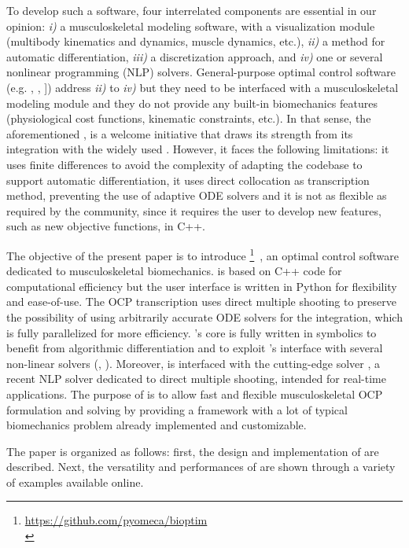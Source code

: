 To develop such a software, four interrelated components are essential in our opinion: \textit{i)} a musculoskeletal modeling software, with a visualization module (multibody kinematics and dynamics, muscle dynamics, etc.), \textit{ii)} a method for automatic differentiation, \textit{iii)} a discretization approach, and \textit{iv)} one or several nonlinear programming (NLP) solvers. 
General-purpose optimal control software (e.g. \gpopsii \cite{patterson2014gpops}, \muscodii \cite{leineweber2003efficient1,leineweber2003efficient2}, \acado \cite{houska2011acado}]) address \textit{ii)} to \textit{iv)} but they need to be interfaced with a musculoskeletal modeling module and they do not provide any built-in biomechanics features (physiological cost functions, kinematic constraints, etc.). 
In that sense, the aforementioned \moco, is a welcome initiative that draws its strength from its integration with the widely used \opensim.
However, it faces the following limitations: it uses finite differences to avoid the complexity of adapting the \opensim codebase to support automatic differentiation, it uses direct collocation as transcription method, preventing the use of adaptive ODE solvers and it is not as flexible as required by the community, since it requires the user to develop new features, such as new objective functions, in C++. 

The objective of the present paper is to introduce \bioptim\footnote{\url{https://github.com/pyomeca/bioptim}\\}~\cite{bioptim2021michaud}, an  optimal control software dedicated to musculoskeletal biomechanics.
\bioptim is based on C++ code for computational efficiency but the user interface is written in Python for flexibility and ease-of-use. 
The OCP transcription uses direct multiple shooting to preserve the possibility of using arbitrarily accurate ODE solvers for the integration, which is fully parallelized for more efficiency.
\bioptim's core is fully written in \casadi symbolics to benefit from algorithmic differentiation and to exploit \casadi 's interface with several non-linear solvers (\ipopt, \snopt).
Moreover, \bioptim is interfaced with the cutting-edge solver \acados, a recent NLP solver dedicated to direct multiple shooting, intended for real-time applications.
The purpose of \bioptim is to allow fast and flexible musculoskeletal OCP formulation and solving by providing a framework with a lot of typical biomechanics problem already implemented and customizable.

The paper is organized as follows: first, the design and implementation of \bioptim are described.
Next, the versatility and performances of \bioptim are shown through a variety of examples available online. 
